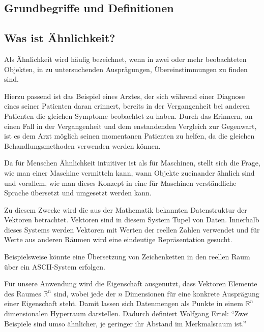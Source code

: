 \documentclass[a4paper]{scrartcl}
\begin{document}
\begin{multicols}{2}
        \section{Grundbegriffe und Definitionen}
            \subsection{Was ist Ähnlichkeit?}
                Als Ähnlichkeit wird häufig bezeichnet, wenn in zwei oder mehr beobachteten Objekten, in zu untersuchenden Ausprägungen, Übereinstimmungen zu finden sind.\par
                Hierzu passend ist das Beispiel eines Arztes, der sich während einer Diagnose eines seiner Patienten daran erinnert, bereits in der Vergangenheit bei anderen Patienten die gleichen Symptome beobachtet zu haben.\cite{ertel2016} Durch das Erinnern, an einen Fall in der Vergangenheit und dem enstandenden Vergleich zur Gegenwart, ist es dem Arzt möglich seinen momentanen Patienten zu helfen, da die gleichen Behandlungsmethoden verwenden werden können.\par
                Da für Menschen Ähnlichkeit intuitiver ist als für Maschinen, stellt sich die Frage, wie man einer Maschine vermitteln kann, wann Objekte zueinander ähnlich sind und vorallem, wie man dieses Konzept in eine für Maschinen verständliche Sprache übersetzt und umgesetzt werden kann.\par
                Zu diesem Zwecke wird die aus der Mathematik bekannten Datenstruktur der Vektoren betrachtet.
                Vektoren sind in diesem System Tupel von Daten. Innerhalb dieses Systems werden Vektoren mit Werten der reellen Zahlen verwendet und für Werte aus anderen Räumen wird eine eindeutige Repräsentation gesucht.\par Beispielsweise könnte eine Übersetzung von Zeichenketten in den reellen Raum über ein ASCII-System erfolgen.\par 
                Für unsere Anwendung wird die Eigenschaft ausgenutzt, dass Vektoren Elemente des Raumes $\mathbb{R}^n$ sind, wobei jede der $n$ Dimensionen für eine konkrete Ausprägung einer Eigenschaft steht. Damit lassen sich Datenmengen als Punkte in einem $\mathbb{R}^n$ dimensionalen Hyperraum darstellen. Dadurch definiert Wolfgang Ertel: “Zwei Beispiele sind umso ähnlicher, je geringer ihr Abstand im Merkmalsraum ist.”\cite{ertel2016_p207} %

\end{multicols}
\end{document}
